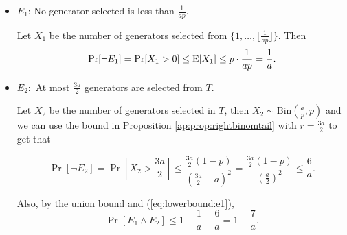 \begin{itemize}
    \item $E_1$: No generator selected is less than $\frac{1}{ap}$.  \par
    Let $X_1$ be the number of generators selected from $\{1,\ldots,\lfloor\frac{1}{ap}\rfloor\}$. Then 
    \begin{equation}\label{eq:lowerbound:e1}
    \mathrm{Pr}[\lnot E_1] = \mathrm{Pr}[X_1 > 0] \leq \mathrm{E}[X_1] \leq p \cdot \frac{1}{ap} = \frac{1}{a}.
    \end{equation}

    \item $E_2:$ At most $\frac{3a}{2}$ generators are selected from $T$.\par 
    Let $X_2$ be the number of generators selected in $T$, then $X_2 \sim \mathrm{Bin}(\frac{a}{p}, p)$ and we can use the bound in Proposition \ref{ap:prop:rightbinomtail} with $r = \frac{3a}{2}$ to get that

    \[\Pr[\lnot E_2] = \Pr\left[X_2 > \frac{3a}{2}\right] \leq  \frac{\frac{3a}{2}(1 - p)}{(\frac{3a}{2} - a)^2} = \frac{\frac{3a}{2}(1 - p)}{(\frac{a}{2})^2}\leq \frac{6}{a}.\]

    Also, by the union bound and (\ref{eq:lowerbound:e1}),
    \begin{equation}\label{eq:lowerbound:e1ande2}
     \Pr[E_1\land E_2] \leq 1 - \frac{1}{a} - \frac{6}{a} = 1 - \frac{7}{a}.
    \end{equation}


\end{itemize}
